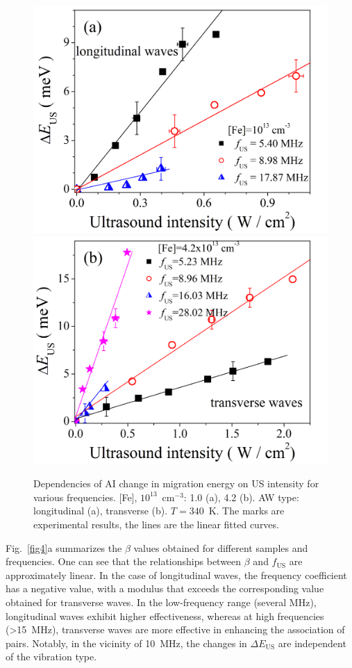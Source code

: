 \documentclass{ttp}
\begin{document}
\begin{figure}
	\centering
     \includegraphics[width=0.4\linewidth]{Fig3a.png}
     \includegraphics[width=0.4\linewidth]{Fig3b.png}
	  \caption{Dependencies of AI change in migration energy on US intensity
      for various frequencies.
       [Fe], $10^{13}$~cm$^{-3}$: 1.0 (a), 4.2 (b).
       AW type: longitudinal (a), transverse (b).
       $T=340$~K.
       The marks are experimental results,
       the lines are the linear fitted curves.
}\label{fig3}
\end{figure}

Fig.~\ref{fig4}a summarizes the $\beta$ values obtained for different samples and frequencies.
One can see that the relationships between $\beta$ and $f_\mathrm{US}$ are approximately linear.
In the case of longitudinal waves, the frequency coefficient has a negative value,
with a modulus that exceeds the corresponding value obtained for transverse waves.
In the low-frequency range (several MHz),
longitudinal waves exhibit higher effectiveness,
whereas at high frequencies (>15~MHz),  transverse waves are more effective
in enhancing the association of pairs.
Notably, in the vicinity of 10~MHz, the changes in $\Delta E_\mathrm{US}$ are independent of the vibration type.
\end{document}
